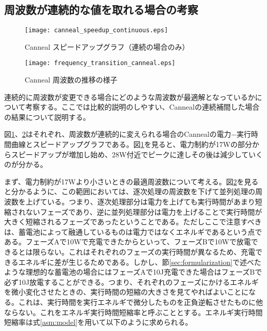 \subsection{周波数が連続的な値を取れる場合の考察}
\label{subsec:continuous}

\begin{figure}[t]
 \begin{center}
  \texttt{[image: canneal\_speedup\_continuous.eps]}
 \end{center}
 \caption{Canneal スピードアップグラフ（連続の場合のみ）}
 \label{fig:canneal_speedup_continuous}
\end{figure}

\begin{figure}[t]
 \begin{center}
  \texttt{[image: frequency\_transition\_canneal.eps]}
 \end{center}
 \caption{Canneal 周波数の推移の様子}
 \label{fig:frequency_transition_canneal}
\end{figure}

連続的に周波数が変更できる場合にどのような周波数が最適解となっているかについて考察する。ここでは比較的説明のしやすい、Cannealの連続補間した場合の結果について説明する。

図\ref{fig:canneal_speedup_continuous}、\ref{fig:frequency_transition_canneal}はそれぞれ、周波数が連続的に変えられる場合のCannealの電力−実行時間曲線とスピードアップグラフである。図\ref{fig:canneal_speedup_continuous}を見ると、電力制約が17Wの部分からスピードアップが増加し始め、28W付近でピークに達しその後は減少していくのが分かる。

まず、電力制約が17Wより小さいときの最適周波数について考える。図\ref{fig:frequency_transition_canneal}を見ると分かるように、この範囲においては、逐次処理の周波数を下げて並列処理の周波数を上げている。つまり、逐次処理部分は電力を上げても実行時間があまり短縮されないフェーズであり、逆に並列処理部分は電力を上げることで実行時間が大きく短縮されるフェーズであったということである。ただしここで注意すべきは、蓄電池によって融通しているものは電力ではなくエネルギであるという点である。フェーズAで10Wで充電できたからといって、フェーズBで10Wで放電できるとは限らない。これはそれぞれのフェーズの実行時間が異なるため、充電できるエネルギに差が生じるためである。しかし、節\ref{sec:formularization}で述べたような理想的な蓄電池の場合にはフェーズAで10J充電できた場合はフェーズBで必ず10J放電することができる。つまり、それぞれのフェーズにかけるエネルギを微小変化させたときの、実行時間の短縮の大きさを見てやればよいことになる。これは、実行時間を実行エネルギで微分したものを正負逆転させたものに他ならない。これをエネルギ実行時間短縮率と呼ぶこととする。エネルギ実行時間短縮率は式\ref{asm:model}を用いて以下のように求められる。

